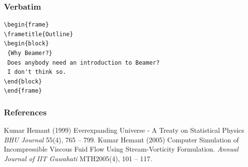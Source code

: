 \documentclass[]{beamer} %
\begin{document}
\begin{frame}[fragile] %
\frametitle{Verbatim}
\begin{example}
\begin{verbatim}
\begin{frame}
\frametitle{Outline}
\begin{block}
 {Why Beamer?}
 Does anybody need an introduction to Beamer?
 I don't think so.
\end{block}
\end{frame}\end{verbatim} %
\end{example}
\end{frame}

\begin{frame}
\frametitle{References}
\footnotesize{
\begin{thebibliography}{99}
  Kumar Hemant (1999)
    \newblock Everexpanding Universe - A Treaty on Statistical Physics  
    \newblock \emph{BHU Journal} 55(4), 765 -- 799.
  Kumar Hemant (2005)
    \newblock Computer Simulation of Incompressible Viscous Fuid Flow Using Stream-Vorticity Formulation.
    \newblock \emph{Annual Journal of IIT Guwahati} MTH2005(4), 101 -- 117.

\end{thebibliography}
}
\end{frame}


\end{document}
